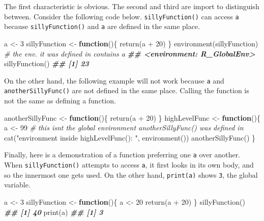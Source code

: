 \documentclass[
  12pt,
  krantz2]{krantz}
\makeatletter
\newenvironment{Shaded}{\begin{snugshade}}{\end{snugshade}}
\newcommand{\CommentTok}[1]{\textcolor[rgb]{0.37,0.37,0.37}{\textit{#1}}}
\newcommand{\ControlFlowTok}[1]{\textcolor[rgb]{0.27,0.27,0.27}{\textbf{#1}}}
\newcommand{\DecValTok}[1]{\textcolor[rgb]{0.06,0.06,0.06}{#1}}
\newcommand{\DocumentationTok}[1]{\textcolor[rgb]{0.37,0.37,0.37}{\textbf{\textit{#1}}}}
\newcommand{\FunctionTok}[1]{\textcolor[rgb]{0,0,0}{#1}}
\newcommand{\NormalTok}[1]{#1}
\newcommand{\OtherTok}[1]{\textcolor[rgb]{0.37,0.37,0.37}{#1}}
\newcommand{\SpecialCharTok}[1]{\textcolor[rgb]{0,0,0}{#1}}
\newcommand{\StringTok}[1]{\textcolor[rgb]{0.5,0.5,0.5}{#1}}
\newenvironment{kframe}{%
\medskip{}
\setlength{\fboxsep}{.8em}
 \def\at@end@of@kframe{}%
 \ifinner\ifhmode%
  \def\at@end@of@kframe{\end{minipage}}%
  \begin{minipage}{\columnwidth}%
 \fi\fi%
 \def\FrameCommand##1{\hskip\@totalleftmargin \hskip-\fboxsep
 \colorbox{shadecolor}{##1}\hskip-\fboxsep
     \hskip-\linewidth \hskip-\@totalleftmargin \hskip\columnwidth}%
 \MakeFramed {\advance\hsize-\width
   \@totalleftmargin\z@ \linewidth\hsize
   \@setminipage}}%
 {\par\unskip\endMakeFramed%
 \at@end@of@kframe}
\renewenvironment{Shaded}{\begin{kframe}}{\end{kframe}}
\makeatother
\begin{document}
The first characteristic is obvious. The second and third are import to distinguish between. Consider the following code below. \texttt{sillyFunction()} can access \texttt{a} because \texttt{sillyFunction()} and \texttt{a} are defined in the same place.

\begin{Shaded}
\begin{Highlighting}[]
\NormalTok{a }\OtherTok{\textless{}{-}} \DecValTok{3}
\NormalTok{sillyFunction }\OtherTok{\textless{}{-}} \ControlFlowTok{function}\NormalTok{()\{}
  \FunctionTok{return}\NormalTok{(a }\SpecialCharTok{+} \DecValTok{20}\NormalTok{) }
\NormalTok{\}}
\FunctionTok{environment}\NormalTok{(sillyFunction) }\CommentTok{\# the env. it was defined in contains a}
\DocumentationTok{\#\# \textless{}environment: R\_GlobalEnv\textgreater{}}
\FunctionTok{sillyFunction}\NormalTok{()}
\DocumentationTok{\#\# [1] 23}
\end{Highlighting}
\end{Shaded}

On the other hand, the following example will not work because \texttt{a} and \texttt{anotherSillyFunc()} are not defined in the same place. Calling the function is not the same as defining a function.

\begin{Shaded}
\begin{Highlighting}[]
\NormalTok{anotherSillyFunc }\OtherTok{\textless{}{-}} \ControlFlowTok{function}\NormalTok{()\{}
  \FunctionTok{return}\NormalTok{(a }\SpecialCharTok{+} \DecValTok{20}\NormalTok{) }
\NormalTok{\}}
\NormalTok{highLevelFunc }\OtherTok{\textless{}{-}} \ControlFlowTok{function}\NormalTok{()\{}
\NormalTok{  a }\OtherTok{\textless{}{-}} \DecValTok{99}
  \CommentTok{\# this isn\textquotesingle{}t the global environment anotherSillyFunc() was defined in}
  \FunctionTok{cat}\NormalTok{(}\StringTok{"environment inside highLevelFunc(): "}\NormalTok{, }\FunctionTok{environment}\NormalTok{())}
  \FunctionTok{anotherSillyFunc}\NormalTok{()}
\NormalTok{\}}
\end{Highlighting}
\end{Shaded}

Finally, here is a demonstration of a function preferring one \texttt{a} over another. When \texttt{sillyFunction()} attempts to access \texttt{a}, it first looks in its own body, and so the innermost one gets used. On the other hand, \texttt{print(a)} shows \texttt{3}, the global variable.

\begin{Shaded}
\begin{Highlighting}[]
\NormalTok{a }\OtherTok{\textless{}{-}} \DecValTok{3}
\NormalTok{sillyFunction }\OtherTok{\textless{}{-}} \ControlFlowTok{function}\NormalTok{()\{}
\NormalTok{  a }\OtherTok{\textless{}{-}} \DecValTok{20}
  \FunctionTok{return}\NormalTok{(a }\SpecialCharTok{+} \DecValTok{20}\NormalTok{) }
\NormalTok{\}}
\FunctionTok{sillyFunction}\NormalTok{()}
\DocumentationTok{\#\# [1] 40}
\FunctionTok{print}\NormalTok{(a)}
\DocumentationTok{\#\# [1] 3}
\end{Highlighting}
\end{Shaded}
\end{document}
